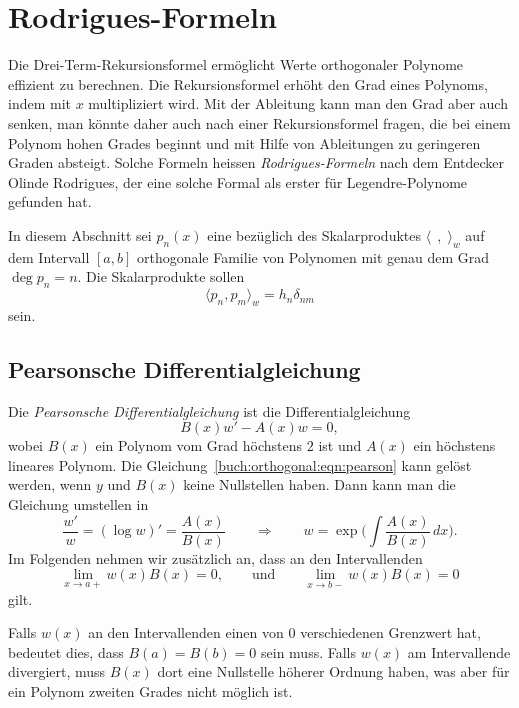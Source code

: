 %
%
%
\section{Rodrigues-Formeln
\label{buch:orthogonalitaet:section:rodrigues}}
Die Drei-Term-Rekursionsformel ermöglicht Werte orthogonaler Polynome
effizient zu berechnen.
Die Rekursionsformel erhöht den Grad eines Polynoms, indem mit $x$ 
multipliziert wird.
Mit der Ableitung kann man den Grad aber auch senken, man könnte daher
auch nach einer Rekursionsformel fragen, die bei einem Polynom hohen
Grades beginnt und mit Hilfe von Ableitungen zu geringeren Graden
absteigt.
Solche Formeln heissen {\em Rodrigues-Formeln} nach dem Entdecker Olinde
%
Rodrigues, der eine solche Formal als erster für Legendre-Polynome
gefunden hat.

In diesem Abschnitt sei $p_n(x)$ eine bezüglich des Skalarproduktes
$\langle\,\;,\;\rangle_w$ auf dem Intervall $[a,b]$ orthogonale Familie
von Polynomen mit genau dem Grad $\deg p_n=n$.
Die Skalarprodukte sollen 
\[
\langle p_n,p_m\rangle_w = h_n\delta_{nm}
\]
sein.

%
%
\subsection{Pearsonsche Differentialgleichung}
Die {\em Pearsonsche Differentialgleichung} ist die Differentialgleichung
\begin{equation}
B(x) w' - A(x) w = 0,
\label{buch:orthogonal:eqn:pearson}
\end{equation}
%
%
wobei $B(x)$ ein Polynom vom Grad höchstens $2$ ist und $A(x)$ ein
höchstens lineares Polynom.
Die Gleichung~\eqref{buch:orthogonal:eqn:pearson}
kann gelöst werden, wenn $y$ und $B(x)$ keine Nullstellen  haben.
Dann kann man die Gleichung umstellen in
\[
\frac{w'}{w}
=
(\log w)'
=
\frac{A(x)}{B(x)}
\qquad\Rightarrow\qquad
w
=
\exp\biggl(
\int\frac{A(x)}{B(x)}
\,dx
\biggr)
.
\]
Im Folgenden nehmen wir zusätzlich an, dass an den Intervallenden
\begin{equation}
\lim_{x\to a+} w(x)B(x) = 0,
\qquad\text{und}\qquad
\lim_{x\to b-} w(x)B(x) = 0
\end{equation}
gilt.

Falls $w(x)$ an den Intervallenden einen von $0$ verschiedenen
Grenzwert hat, bedeutet dies, dass $B(a)=B(b)=0$ sein muss.
Falls $w(x)$ am Intervallende divergiert, muss $B(x)$ dort eine
Nullstelle höherer Ordnung haben, was aber für ein Polynom
zweiten Grades nicht möglich ist.

